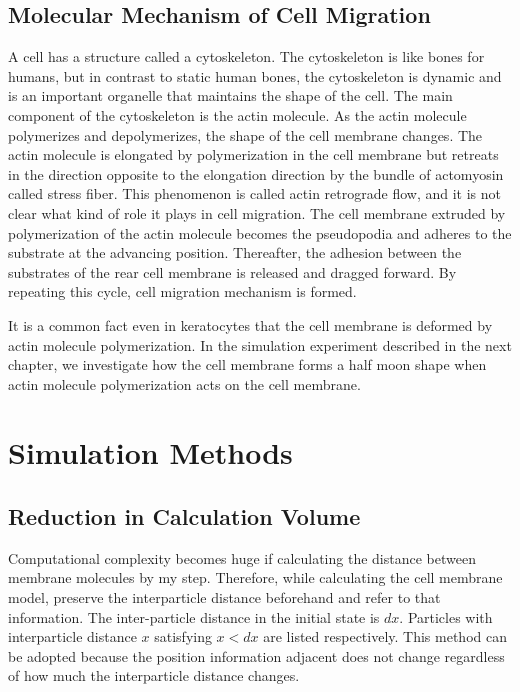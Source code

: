 \documentclass[a4paper,12pt]{book}
\begin{document}
\section{Molecular Mechanism of Cell Migration}
A cell has a structure called a cytoskeleton. The cytoskeleton is like bones for humans, but in contrast to static human bones, the cytoskeleton is dynamic and is an important organelle that maintains the shape of the cell. The main component of the cytoskeleton is the actin molecule. As the actin molecule polymerizes and depolymerizes, the shape of the cell membrane changes. The actin molecule is elongated by polymerization in the cell membrane but retreats in the direction opposite to the elongation direction by the bundle of actomyosin called stress fiber. This phenomenon is called actin retrograde flow, and it is not clear what kind of role it plays in cell migration. The cell membrane extruded by polymerization of the actin molecule becomes the pseudopodia and adheres to the substrate at the advancing position. Thereafter, the adhesion between the substrates of the rear cell membrane is released and dragged forward. By repeating this cycle, cell migration mechanism is formed.

It is a common fact even in keratocytes that the cell membrane is deformed by actin molecule polymerization. In the simulation experiment described in the next chapter, we investigate how the cell membrane forms a half moon shape when actin molecule polymerization acts on the cell membrane.


\chapter{Simulation Methods}
\section{Reduction in Calculation Volume}
Computational complexity becomes huge if calculating the distance between membrane molecules by my step. Therefore, while calculating the cell membrane model, preserve the interparticle distance beforehand and refer to that information. The inter-particle distance in the initial state is $dx$. Particles with interparticle distance $x$ satisfying $x <dx$ are listed respectively. This method can be adopted because the position information adjacent does not change regardless of how much the interparticle distance changes.
\end{document}
